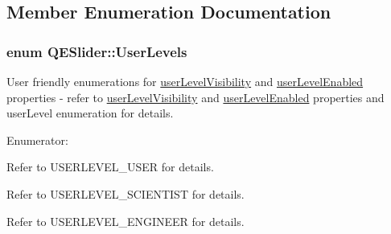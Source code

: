 \subsection{Member Enumeration Documentation}
\hypertarget{classQESlider_ad8ddcac593e2ec7441ae04ec7c8a7b26}{
\subsubsection[{UserLevels}]{\setlength{\rightskip}{0pt plus 5cm}enum {\bf QESlider::UserLevels}}}
\label{classQESlider_ad8ddcac593e2ec7441ae04ec7c8a7b26}
User friendly enumerations for \hyperlink{classQESlider_a6aea2f373a3b07597dd8db1dcb2803cc}{userLevelVisibility} and \hyperlink{classQESlider_a1cd3bdc1252e8df1fe4769ec93748d8a}{userLevelEnabled} properties -\/ refer to \hyperlink{classQESlider_a6aea2f373a3b07597dd8db1dcb2803cc}{userLevelVisibility} and \hyperlink{classQESlider_a1cd3bdc1252e8df1fe4769ec93748d8a}{userLevelEnabled} properties and userLevel enumeration for details. \begin{Desc}
\item[Enumerator: ]\par
\begin{description}
\item[{\em 
\hypertarget{classQESlider_ad8ddcac593e2ec7441ae04ec7c8a7b26a384550b27f0b301c8948735572aa46d2}{
User}
\label{classQESlider_ad8ddcac593e2ec7441ae04ec7c8a7b26a384550b27f0b301c8948735572aa46d2}
}]Refer to USERLEVEL\_\-USER for details. \item[{\em 
\hypertarget{classQESlider_ad8ddcac593e2ec7441ae04ec7c8a7b26a58a44404b99bb8caf26d60a582be652b}{
Scientist}
\label{classQESlider_ad8ddcac593e2ec7441ae04ec7c8a7b26a58a44404b99bb8caf26d60a582be652b}
}]Refer to USERLEVEL\_\-SCIENTIST for details. \item[{\em 
\hypertarget{classQESlider_ad8ddcac593e2ec7441ae04ec7c8a7b26a92c56e98d2cf89d99aa591fa5b658e86}{
Engineer}
\label{classQESlider_ad8ddcac593e2ec7441ae04ec7c8a7b26a92c56e98d2cf89d99aa591fa5b658e86}
}]Refer to USERLEVEL\_\-ENGINEER for details. \end{description}
\end{Desc}



